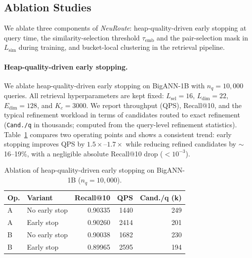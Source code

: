 \documentclass[sigconf, nonacm]{acmart}
\begin{document}
\subsection{Ablation Studies}
We ablate three components of \textit{NeuRoute}: heap-quality-driven early stopping at query time,
the similarity-selection threshold $\tau_{\text{emb}}$ and the pair-selection mask in $L_{\text{sim}}$ during training,
and bucket-local clustering in the retrieval pipeline.

\paragraph{Heap-quality-driven early stopping.}
We ablate heap-quality-driven early stopping on BigANN-1B with $n_q=10{,}000$ queries.
All retrieval hyperparameters are kept fixed: $L_{\text{sel}}=16$, $L_{\text{dim}}=22$, $E_{\text{dim}}=128$, and $K_c=3000$.
We report throughput (QPS), Recall@10, and the typical refinement workload in terms of candidates routed to exact refinement
(\texttt{Cand./q} in thousands; computed from the query-level refinement statistics).
Table~\ref{tab:ablation_early_stop} compares two operating points and shows a consistent trend:
early stopping improves QPS by $1.5\times$--$1.7\times$ while reducing refined candidates by $\sim$16--19\%,
with a negligible absolute Recall@10 drop ($<10^{-3}$).

\begin{table}[t]
\centering
\small
\setlength{\tabcolsep}{3pt}
\renewcommand{\arraystretch}{1.05}
\caption{Ablation of heap-quality-driven early stopping on BigANN-1B ($n_q=10{,}000$).}
\label{tab:ablation_early_stop}
\begin{tabular}{llrrr}
\toprule
Op. & Variant & Recall@10 & QPS & Cand./q (k) \\
\midrule
A & No early stop & 0.90335 & 1440 & 249 \\
A & Early stop    & 0.90260 & 2414 & 201 \\
\midrule
B & No early stop & 0.90038 & 1682 & 230 \\
B & Early stop    & 0.89965 & 2595 & 194 \\
\bottomrule
\end{tabular}
\end{table}
\end{document}
